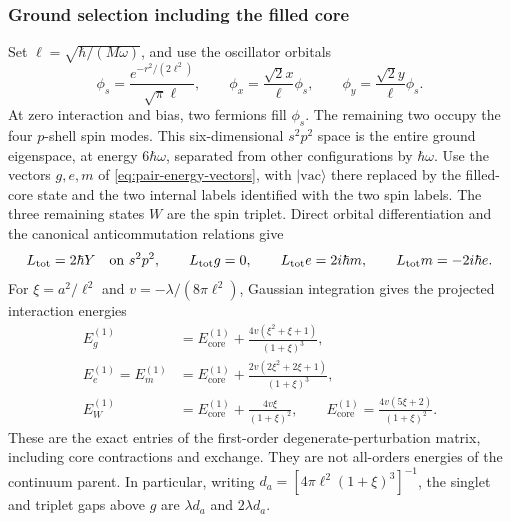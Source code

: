 \documentclass[11pt,reqno]{scrartcl}
\newcommand{\ket}[1]{\lvert #1\rangle}
\theoremstyle{plain}
\theoremstyle{definition}
\theoremstyle{remark}
\begin{document}
\subsubsection*{Ground selection including the filled core}
Set \(\ell=\sqrt{\hbar/(M\omega)}\), and use the oscillator orbitals
\begin{equation}
 \phi_s=\frac{e^{-r^2/(2\ell^2)}}{\sqrt\pi\ell},\qquad
 \phi_x=\frac{\sqrt2x}{\ell}\phi_s,\qquad
 \phi_y=\frac{\sqrt2y}{\ell}\phi_s.
 \label{eq:orbital-three-orbitals}
\end{equation}
At zero interaction and bias, two fermions fill \(\phi_s\).  The remaining
two occupy the four \(p\)-shell spin modes.  This six-dimensional
\(s^2p^2\) space is the entire ground eigenspace, at energy \(6\hbar\omega\),
separated from other configurations by \(\hbar\omega\).  Use the vectors
\(g,e,m\) of \cref{eq:pair-energy-vectors}, with
\(\ket{\mathrm{vac}}\) there replaced by the filled-core state and the
two internal labels identified with the two spin labels.  The three
remaining states \(W\) are the spin triplet.  Direct orbital differentiation
and the canonical anticommutation relations give
\begin{equation}
 L_{\mathrm{tot}}=2\hbar Y\quad\hbox{on }s^2p^2,
 \qquad L_{\mathrm{tot}}g=0,\qquad
 L_{\mathrm{tot}}e=2i\hbar m,\qquad
 L_{\mathrm{tot}}m=-2i\hbar e.
 \label{eq:orbital-derived-current}
\end{equation}
For \(\xi=a^2/\ell^2\) and \(v=-\lambda/(8\pi\ell^2)\), Gaussian
integration gives the projected interaction energies
\begin{align}
 E_g^{(1)}&=E_{\mathrm{core}}^{(1)}
       +\frac{4v(\xi^2+\xi+1)}{(1+\xi)^3},\\
 E_e^{(1)}=E_m^{(1)}&=E_{\mathrm{core}}^{(1)}
       +\frac{2v(2\xi^2+2\xi+1)}{(1+\xi)^3},\\
 E_W^{(1)}&=E_{\mathrm{core}}^{(1)}
       +\frac{4v\xi}{(1+\xi)^2},\qquad
 E_{\mathrm{core}}^{(1)}=\frac{4v(5\xi+2)}{(1+\xi)^2}.
 \label{eq:orbital-projected-energies}
\end{align}
These are the exact entries of the first-order degenerate-perturbation
matrix, including core contractions and exchange.  They are not
all-orders energies of the continuum parent.  In particular, writing
\(d_a=[4\pi\ell^2(1+\xi)^3]^{-1}\), the singlet and triplet gaps
above \(g\) are \(\lambda d_a\) and \(2\lambda d_a\).
\end{document}
